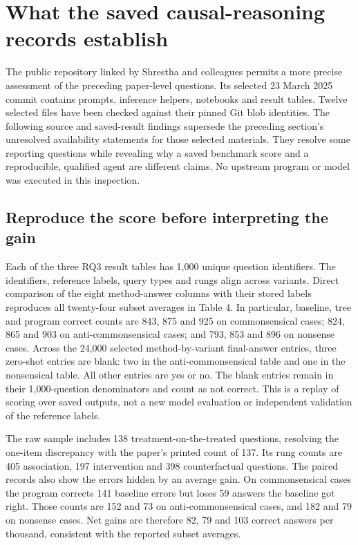 \section{What the saved causal-reasoning records establish}
\label{exec21:prophetsrepo-scope}
The public repository linked by Shrestha and colleagues permits a more precise
assessment of the preceding paper-level questions. Its selected 23 March 2025
commit contains prompts, inference helpers, notebooks and result tables.
Twelve selected files have been checked against their pinned Git blob identities.
The following source and saved-result findings supersede the preceding section's
unresolved availability statements for those selected materials. They resolve
some reporting questions while revealing why a saved benchmark score and a
reproducible, qualified agent are different claims. No upstream program or
model was executed in this inspection.~\citep{exec21_prophets_repo}

\subsection{Reproduce the score before interpreting the gain}
\label{exec21:prophetsrepo-results}
Each of the three RQ3 result tables has 1,000 unique question identifiers. The
identifiers, reference labels, query types and rungs align across variants.
Direct comparison of the eight method-answer columns with their stored labels
reproduces all twenty-four subset averages in Table 4. In particular, baseline,
tree and program correct counts are 843, 875 and 925 on commonsensical cases;
824, 865 and 903 on anti-commonsensical cases; and 793, 853 and 896 on nonsense
cases. Across the 24,000 selected method-by-variant final-answer entries, three
zero-shot entries are blank: two in the anti-commonsensical table and one
in the nonsensical table. All other entries are yes or no. The blank entries
remain in their 1,000-question denominators and count as not correct. This is a replay
of scoring over saved outputs, not a new model evaluation or independent
validation of the reference labels.~\citep{exec21_prophets_repo,exec21_prophets_repo_reference}

The raw sample includes 138 treatment-on-the-treated questions, resolving the
one-item discrepancy with the paper's printed count of 137. Its rung counts
are 405 association, 197 intervention and 398 counterfactual questions. The
paired records also show the errors hidden by an average gain. On commonsensical
cases the program corrects 141 baseline errors but loses 59 answers the baseline
got right. Those counts are 152 and 73 on anti-commonsensical cases, and 182 and
79 on nonsense cases. Net gains are therefore 82, 79 and 103 correct answers
per thousand, consistent with the reported subset averages.
\citep{exec21_prophets_repo_reference}

